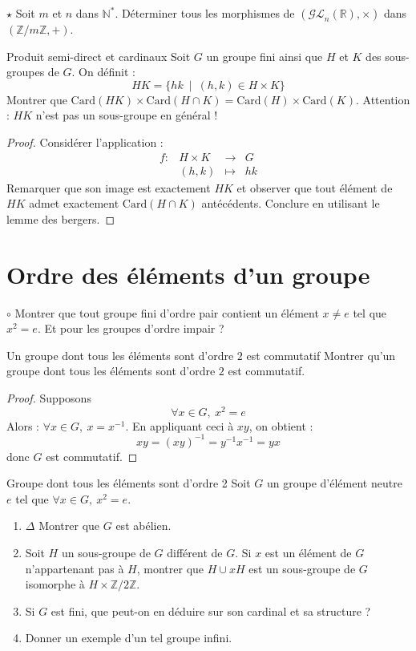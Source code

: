 \documentclass[french,a4paper]{article}
\newcommand{\N}{\mathbb{N}}
\newcommand{\Z}{\mathbb{Z}}
\newcommand{\R}{\mathbb{R}}
\newcommand{\st}{^*}
\newcommand{\inv}{^{-1}}
\newcommand{\card}{\text{Card}}
\theoremstyle{plain}
\theoremstyle{definition}
\theoremstyle{remark}
\begin{document}
\begin{ex}[Moulin.17]{$\star$}
	Soit $m$ et $n$ dans $\N\st$. Déterminer tous les morphismes de $(\mathcal{GL}_n(\R),\times)$ dans $(\Z/m\Z,+)$.
\end{ex}

\begin{ex}{Produit semi-direct et cardinaux}
	Soit $G$ un groupe fini ainsi que $H$ et $K$ des sous-groupes de $G$. On définit : $$HK=\{hk\ \mid \ (h,k)\in H\times K\}$$ Montrer que $\card(HK)\times\card(H\cap K)=\card(H)\times\card(K)$. Attention : $HK$ n'est pas un sous-groupe en général !
\end{ex}

\begin{proof}
	Considérer l'application : $$\begin{array}{lrcl}
		f:&H\times K&\longrightarrow&G \\
		&(h,k)&\longmapsto&hk
	\end{array}$$ Remarquer que son image est exactement $HK$ et observer que tout élément de $HK$ admet exactement $\card(H\cap K)$ antécédents. Conclure en utilisant le lemme des bergers.
\end{proof}

\section{Ordre des éléments d'un groupe}

\begin{ex}[Moulin.18]{$\circ$}
	Montrer que tout groupe fini d'ordre pair contient un élément $x\ne e$ tel que $x^2=e$. Et pour les groupes d'ordre impair ?
\end{ex}

\begin{ex}{Un groupe dont tous les éléments sont d'ordre $2$ est commutatif}
	Montrer qu'un groupe dont tous les éléments sont d'ordre $2$ est commutatif.
\end{ex}

\begin{proof}
	Supposons $$\forall x\in G,\ x^2=e$$ Alors : $\forall x\in G,\ x=x\inv$. En appliquant ceci à $xy$, on obtient : $$xy=(xy)\inv=y\inv x\inv=yx$$ donc $G$ est commutatif.
\end{proof}

\begin{ex}[Moulin.19]{Groupe dont tous les éléments sont d'ordre 2}
	Soit $G$ un groupe d'élément neutre $e$ tel que $\forall x\in G,\ x^2=e$.
	\begin{enumerate}
		\item $\Delta$ Montrer que $G$ est abélien.
		\item Soit $H$ un sous-groupe de $G$ différent de $G$. Si $x$ est un élément de $G$ n'appartenant pas à $H$, montrer que $H\cup xH$ est un sous-groupe de $G$ isomorphe à $H\times \Z/2\Z$.
		\item Si $G$ est fini, que peut-on en déduire sur son cardinal et sa structure ?
		\item Donner un exemple d'un tel groupe infini.
	\end{enumerate}
\end{ex}
\end{document}
